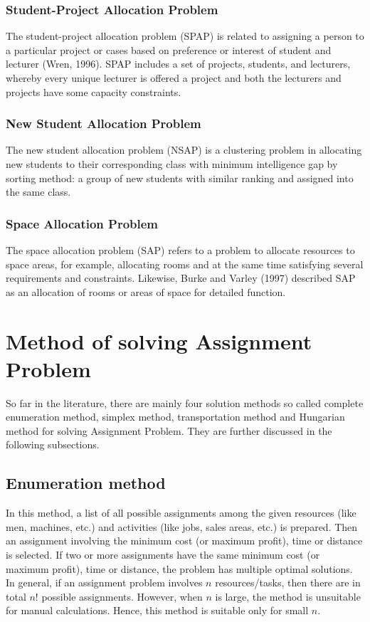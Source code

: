\documentclass[11pt]{report}
\begin{document}
	\subsubsection{Student-Project Allocation Problem}
	The student-project allocation problem (SPAP) is related to assigning a person to a particular project or cases based on preference or interest of student and lecturer (Wren, 1996). SPAP includes a set of projects, students, and lecturers, whereby every unique lecturer is offered a project and both the lecturers and projects have some capacity constraints.
	
	\subsubsection{New Student Allocation Problem}
	The new student allocation problem (NSAP) is a clustering problem in allocating new students to their corresponding class with minimum intelligence gap by sorting method: a group of new students with similar ranking and assigned into the same class.
	
	\subsubsection{Space Allocation Problem}
	The space allocation problem (SAP) refers to a problem to allocate resources to space areas, for example, allocating rooms and at the same time satisfying several requirements and constraints. Likewise, Burke and Varley (1997) described SAP as an allocation of rooms or areas of space for detailed function.
	
	\section{Method of solving Assignment Problem}
	So far in the literature, there are mainly four solution methods so called complete enumeration method, simplex method, transportation method and Hungarian method for solving Assignment Problem. They are further discussed in the following subsections.
	
	\subsection{Enumeration method}
	In this method, a list of all possible assignments among the given resources (like men, machines, etc.) and activities (like jobs, sales areas, etc.) is prepared. Then an assignment involving the minimum cost (or maximum profit), time or distance is selected. If two or more assignments have
	the same minimum cost (or maximum profit), time or distance, the problem has multiple optimal solutions. In general, if an assignment problem involves $n$ resources/tasks, then there are in total $n!$ possible assignments. However, when $n$ is large, the method is unsuitable for manual calculations. Hence, this method is suitable only for small $n$.
	
\end{document}
